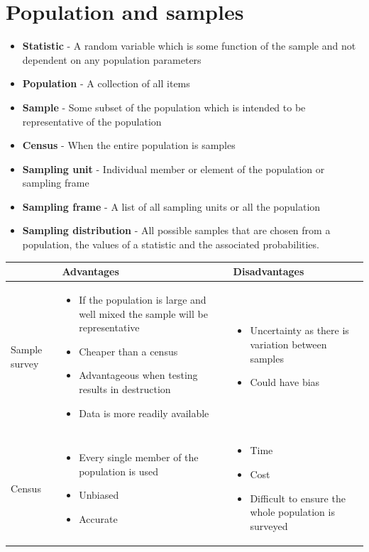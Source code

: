 \documentclass{article}[18pt]
\begin{document}
\section{Population and samples}
\setitemize{}
\begin{itemize}
\item \textbf{Statistic} - A random variable which is some function of the sample and not dependent on any population parameters
\item \textbf{Population} - A collection of all items
\item \textbf{Sample} - Some subset of the population which is intended to be representative of the population
\item \textbf{Census} - When the entire population is samples
\item \textbf{Sampling unit} - Individual member or element of the population or sampling frame
\item \textbf{Sampling frame} - A list of all sampling units or all the population
\item \textbf{Sampling distribution} - All possible samples that are chosen from a population, the values of a statistic and the associated probabilities.
\end{itemize}
\begin{tabularx}{\textwidth}{|X|X|X|}
\hline
&Advantages&Disadvantages\\
\hline
Sample survey&
\begin{itemize}
\item If the population is large and well mixed the sample will be representative
\item Cheaper than a census
\item Advantageous when testing results in destruction
\item Data is more readily available
\end{itemize}&
\begin{itemize}
\item Uncertainty as there is variation between samples
\item Could have bias
\end{itemize}\\
\hline
Census&
\begin{itemize}
\item Every single member of the population is used
\item Unbiased
\item Accurate
\end{itemize}&
\begin{itemize}
\item Time
\item Cost
\item Difficult to ensure the whole population is surveyed
\end{itemize}\\
\hline
\end{tabularx}
\end{document}
